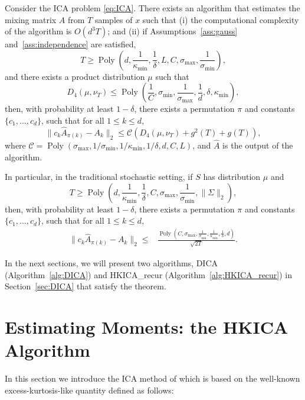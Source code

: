\documentclass[twoside,11pt]{article}
\DeclareMathOperator{\pol}{Poly}
\newcommand{\poly}[1]{\pol\left(#1\right)}
\begin{document}
\begin{theorem}
\label{thm:finalRes} Consider the ICA problem \eqref{eq:ICA}. There exists an algorithm that estimates the mixing matrix $A$ from $T$ samples of $x$ such that (i) the computational complexity of the algorithm is $O(d^3 T)$; and (ii) if Assumptions~\ref{ass:gauss} and~\ref{ass:independence} are satisfied,
\vspace{-2mm}
\[
T \ge \poly{d, \frac{1}{\kappa_{\min}}, \frac{1}{\delta}, L, C, \sigma_{\max}, \frac{1}{\sigma_{\min}}},
\]
and there exists a product distribution  $\mu$  such that 
\vspace{-2mm}
\[
D_4(\mu, \nu_T) \le \poly{\frac{1}{C},  \sigma_{\min},  \frac{1}{\sigma_{\max}},\frac{1}{d}, \delta, \kappa_{\min}},
\]
then, with probability at least $1-\delta$, there exists a permutation $\pi$ and constants $\{c_1,\ldots,c_d\}$, such that for all $1\le k\le d$,
\vspace{-3mm}
\[
\| c_k\hat{A}_{\pi(k)} - A_k\|_2 \le \mathcal{C}\left(D_4(\mu, \nu_T)+g^2(T) +g(T) \right),
\]
where $\mathcal{C} = \poly{\sigma_{\max}, 1/\sigma_{\min}, 1/\kappa_{\min},1/\delta, d, C, L}$, and $\hat{A}$ is the output of the algorithm.

In particular, in the traditional stochastic setting, if $S$ has distribution $\mu$ and
\vspace{-2mm} 
\[
T \ge \poly{d, \frac{1}{\kappa_{\min}}, \frac{1}{\delta}, C, \sigma_{\max}, \frac{1}{\sigma_{\min}}, \|\Sigma\|_2},
\]
then, with probability at least $1-\delta$, there exists a permutation $\pi$ and constants $\{c_1,\ldots,c_d\}$, such that for all $1\le k\le d$,
\vspace{-3mm}
\begin{align*}
 \| c_k\hat{A}_{\pi(k)} - A_k\|_2 \le 
& \frac{\poly{C, \sigma_{\max}, \frac{1}{\sigma_{\min}}, \frac{1}{\kappa_{\min}},\frac{1}{\delta}, d}}{\sqrt{2T}}.
\end{align*}
\end{theorem}

In the next sections, we will present two algorithms, DICA (Algorithm~\ref{alg:DICA}) and HKICA\_recur (Algorithm~\ref{alg:HKICA_recur}) in Section~\ref{sec:DICA} that 
satisfy the theorem.
\fi

\section{Estimating Moments: the HKICA Algorithm}
\label{sec:HKICA}
In this section we introduce the ICA method of \citet{hsu2013learning} which is based on the well-known excess-kurtosis-like quantity
defined as follows:
\end{document}
